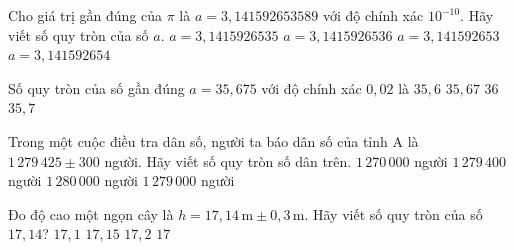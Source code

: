 

\begin{ex}%
	Cho giá trị gần đúng của $\pi $ là $ a=3,141592653589$ với  độ chính xác $10^{-10}$. Hãy viết số quy tròn của số $a$.
	 \choice
		{$  a=3{,}1415926535$}
		{$ a=3{,}1415926536$} 
		{$ a=3{,}141592653$} 
		{\True $ a=3{,}141592654$} 
\end{ex}

\begin{ex}%
	Số quy tròn của  số gần đúng $ a=35{,}675$ với độ chính xác $ 0{,}02$ là
	 \choice
		 {$35{,}6$}
		{$35{,}67$} 
		 {$36$}
		{\True  $35{,}7$}
\end{ex}

\begin{ex}%
	Trong một cuộc điều tra dân số, người ta báo dân số của tỉnh A là $ 1\, 279 \,  425\pm 300$ người. Hãy viết số quy tròn số dân trên.
	 \choice
		{$ 1\, 270\, 000$ người} 
		{$ 1\, 279\, 400$ người} 
		{$  1\, 280\, 000$ người}
		{\True $  1\, 279\, 000$ người}
\end{ex}

\begin{ex}%
	Đo độ  cao một ngọn cây là $h=17{,}14\,\text{m}\pm 0{,}3\,\text{m}$. Hãy viết số quy tròn của số $17{,}14$?
	 \choice
		{$17{,}1$} 
		{$17{,}15$} 
		 {$17{,}2$}
		{\True  $17$}
\end{ex}

